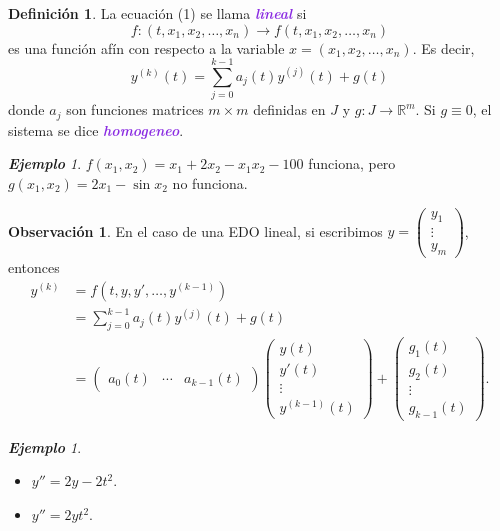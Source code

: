 \documentclass{article}
\theoremstyle{definition}
\newtheorem{definition}[theorem]{Definición}
\newtheorem*{obs}{Observación}
\theoremstyle{remark}
\newtheorem{example}[theorem]{\textbf{Ejemplo}}
\numberwithin{equation}{section}
\newcommand{\R}{\mathbb{R}}
\newcommand{\matr}[1]{\begin{pmatrix}#1\end{pmatrix}}
\newcommand{\wea}[1]{\textcolor{BlueViolet}{\textbf{\emph{#1}}}}
\begin{document}
\begin{definition}
    La ecuación (1) se llama \wea{lineal} si $$f \colon (t,x_1,x_2,\dots,x_n) \to f(t,x_1,x_2,\dots,x_n)$$ es una función afín con respecto a la variable $x = (x_1,x_2,\dots,x_n)$. Es decir,
    \[ y^{(k)}(t) = \sum_{j=0}^{k-1} a_j(t) y^{(j)}(t) + g(t) \]
    donde $a_j$ son funciones matrices $m \times m$ definidas en $J$ y $g \colon J \to \R^m$.
    Si $g \equiv 0$, el sistema se dice \wea{homogeneo}.
\end{definition}

\begin{example}
    $f(x_1,x_2) = x_1 + 2x_2 - x_1 x_2 - 100$ funciona, pero $g(x_1,x_2) = 2x_1 - \sin x_2$ no funciona.
\end{example}

\begin{obs}
    En el caso de una EDO lineal, si escribimos $y = \matr{y_1 \\ \vdots \\ y_m}$, entonces
    \begin{align*}
        y^{(k)} &= f(t,y,y',\dots,y^{(k-1)}) \\
        &= \sum_{j=0}^{k-1} a_j(t) y^{(j)}(t) + g(t) \\
        &= \matr{a_0(t) & \cdots & a_{k-1}(t)} \matr{y(t) \\ y'(t) \\ \vdots \\ y^{(k-1)}(t)} + \matr{g_1(t) \\ g_2(t) \\ \vdots \\ g_{k-1}(t)}.
    \end{align*}
\end{obs}

\begin{example}
    \ \begin{itemize}
        \item $y'' = 2y - 2t^2$.
        \item $y'' = 2yt^2$.
    \end{itemize}
\end{example}
\end{document}
